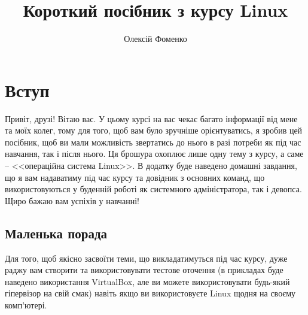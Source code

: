 \documentclass[10pt,a4paper]{fancyhandout}
\title{\textbf{Короткий посібник з курсу Linux}}
\author[О. Фоменко]{Олексій Фоменко}
\date{}
\begin{document}
\maketitle
\section{Вступ}
Привіт, друзі! Вітаю вас. У цьому курсі на вас чекає багато інформації від мене та моїх колег, тому для того, щоб вам було зручніше орієнтуватись, я зробив цей посібник, щоб ви мали можливість звертатись до нього в разі потреби як під час навчання, так і після нього. Ця брошура охоплює лише одну тему з курсу, а саме -- <<операційна система Linux>>. В додатку буде наведено домашні завдання, що я вам надаватиму під час курсу та довідник з основних команд, що використовуються у буденній роботі як системного адміністратора, так і девопса. \\
Щиро бажаю вам успіхів у навчанні!

\subsection{Маленька порада}
Для того, щоб якісно засвоїти теми, що викладатимуться під час курсу, дуже раджу вам створити та використовувати тестове оточення (в прикладах буде наведено використання VirtualBox, але ви можете використовувати будь-який гіпервізор на свій смак) навіть якщо ви використовуєте Linux щодня на своєму комп'ютері.
\end{document}
